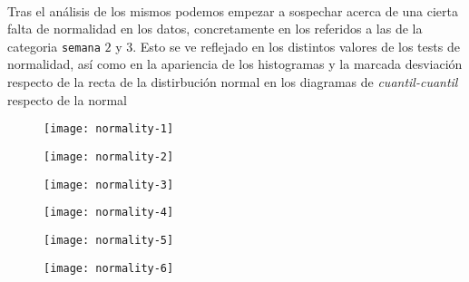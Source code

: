\documentclass[11pt]{article}
\begin{document}
      \paragraph{}
      Tras el análisis de los mismos podemos empezar a sospechar acerca de una cierta falta de normalidad en los datos, concretamente en los referidos a las de la categoria \texttt{semana} $2$ y $3$. Esto se ve reflejado en los distintos valores de los tests de normalidad, así como en la apariencia de los histogramas y la marcada desviación respecto de la recta de la distirbución normal en los diagramas de \emph{cuantil-cuantil} respecto de la normal

      \begin{figure}
        \centering
        \begin{minipage}{.49\textwidth}
          \centering
          \texttt{[image: normality-1]}
          \caption{}
          \label{fig:normality-1}
        \end{minipage}
        \begin{minipage}{.49\textwidth}
          \centering
          \texttt{[image: normality-2]}
          \caption{}
          \label{fig:normality-2}
        \end{minipage}
        \begin{minipage}{.49\textwidth}
          \centering
          \texttt{[image: normality-3]}
          \caption{}
          \label{fig:normality-3}
        \end{minipage}
        \begin{minipage}{.49\textwidth}
          \centering
          \texttt{[image: normality-4]}
          \caption{}
          \label{fig:normality-4}
        \end{minipage}
        \begin{minipage}{.49\textwidth}
          \centering
          \texttt{[image: normality-5]}
          \caption{}
          \label{fig:normality-5}
        \end{minipage}
        \begin{minipage}{.49\textwidth}
          \centering
          \texttt{[image: normality-6]}
          \caption{}
          \label{fig:normality-6}
        \end{minipage}
      \end{figure}
\end{document}
